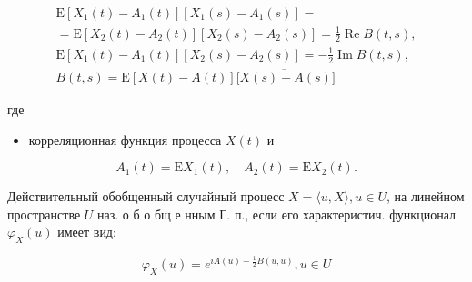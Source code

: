 \documentclass[10pt]{article}
\begin{document}
\[

\begin{gathered}

\mathrm{E}\left[X_{1}(t)-A_{1}(t)\right]\left[X_{1}(s)-A_{1}(s)\right]= \\

=\mathrm{E}\left[X_{2}(t)-A_{2}(t)\right]\left[X_{2}(s)-A_{2}(s)\right]=\frac{1}{2} \operatorname{Re} B(t, s), \\

\mathrm{E}\left[X_{1}(t)-A_{1}(t)\right]\left[X_{2}(s)-A_{2}(s)\right]=-\frac{1}{2} \operatorname{Im} B(t, s), \\

B(t, s)=\mathrm{E}[X(t)-A(t)] \overline{[X(s)-A(s)}]

\end{gathered}

\]



где



\begin{itemize}

  \item корреляционная функция процесса $X(t)$ и

\end{itemize}



\[

A_{1}(t)=\mathrm{E} X_{1}(t), \quad A_{2}(t)=\mathrm{E} X_{2}(t) .

\]



Действительный обобщенный случайный процесс $X=\langle u, X\rangle, u \in U$, на линейном пространстве $U$ наз. о б о бщ е нным Г. п., если его характеристич. функционал $\varphi_{X}(u)$ имеет вид:



\[

\varphi_{X}(u)=e^{i A(u)-\frac{1}{2} B(u, u)}, u \in U

\]
\end{document}
